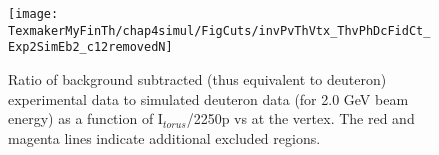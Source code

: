 %


\begin{figure}[h] %
\centering
\leavevmode \texttt{[image: TexmakerMyFinTh/chap4simul/FigCuts/invPvThVtx\_ThvPhDcFidCt\_Exp2SimEb2\_c12removedN]} 
\caption[Angular Cuts shown in Exp(D)/Sim(D).]{Ratio of background subtracted  (thus equivalent to deuteron) experimental data to simulated deuteron data (for 2.0 GeV beam energy) as a function of I$_{torus}$/2250p vs \th at the vertex. The red and magenta lines indicate additional excluded regions. %
}
\label{figangCts2}
\end{figure}
